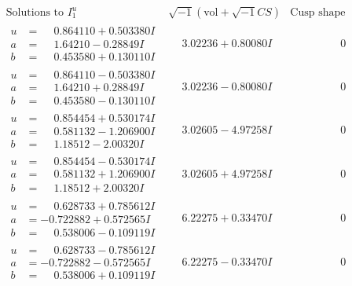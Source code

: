 \documentclass[1p]{elsarticle_modified}
\theoremstyle{definition}
\newcommand{\I}{\sqrt{-1}}
\begin{document}
$$\begin{array}{c|c|c}  
\text{Solutions to }I^u_{1}& \I (\text{vol} + \sqrt{-1}CS) & \text{Cusp shape}\\
 \hline 
\begin{aligned}
u &= \phantom{-}0.864110 + 0.503380 I \\
a &= \phantom{-}1.64210 - 0.28849 I \\
b &= \phantom{-}0.453580 + 0.130110 I\end{aligned}
 & \phantom{-}3.02236 + 0.80080 I & \phantom{-0.000000 } 0 \\ \hline\begin{aligned}
u &= \phantom{-}0.864110 - 0.503380 I \\
a &= \phantom{-}1.64210 + 0.28849 I \\
b &= \phantom{-}0.453580 - 0.130110 I\end{aligned}
 & \phantom{-}3.02236 - 0.80080 I & \phantom{-0.000000 } 0 \\ \hline\begin{aligned}
u &= \phantom{-}0.854454 + 0.530174 I \\
a &= \phantom{-}0.581132 - 1.206900 I \\
b &= \phantom{-}1.18512 - 2.00320 I\end{aligned}
 & \phantom{-}3.02605 - 4.97258 I & \phantom{-0.000000 } 0 \\ \hline\begin{aligned}
u &= \phantom{-}0.854454 - 0.530174 I \\
a &= \phantom{-}0.581132 + 1.206900 I \\
b &= \phantom{-}1.18512 + 2.00320 I\end{aligned}
 & \phantom{-}3.02605 + 4.97258 I & \phantom{-0.000000 } 0 \\ \hline\begin{aligned}
u &= \phantom{-}0.628733 + 0.785612 I \\
a &= -0.722882 + 0.572565 I \\
b &= \phantom{-}0.538006 - 0.109119 I\end{aligned}
 & \phantom{-}6.22275 + 0.33470 I & \phantom{-0.000000 } 0 \\ \hline\begin{aligned}
u &= \phantom{-}0.628733 - 0.785612 I \\
a &= -0.722882 - 0.572565 I \\
b &= \phantom{-}0.538006 + 0.109119 I\end{aligned}
 & \phantom{-}6.22275 - 0.33470 I & \phantom{-0.000000 } 0 \\ \hline\begin{aligned}

\end{aligned}
\end{array}$$
\end{document}
